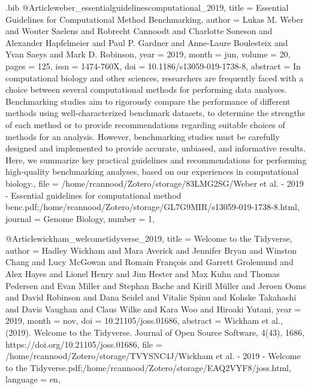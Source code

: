 \documentclass[
  table,
  10pt,
  a4paper]{article}
\begin{document}
\begin{filecontents}{\jobname.bib}
@Article{weber_essentialguidelinescomputational_2019,
	title = {Essential Guidelines for Computational Method Benchmarking},
	author = {Lukas M. Weber and Wouter Saelens and Robrecht Cannoodt and Charlotte Soneson and Alexander Hapfelmeier and Paul P. Gardner and Anne-Laure Boulesteix and Yvan Saeys and Mark D. Robinson},
	year = {2019},
	month = {jun},
	volume = {20},
	pages = {125},
	issn = {1474-760X},
	doi = {10.1186/s13059-019-1738-8},
	abstract = {In computational biology and other sciences, researchers are frequently faced with a choice between several computational methods for performing data analyses. Benchmarking studies aim to rigorously compare the performance of different methods using well-characterized benchmark datasets, to determine the strengths of each method or to provide recommendations regarding suitable choices of methods for an analysis. However, benchmarking studies must be carefully designed and implemented to provide accurate, unbiased, and informative results. Here, we summarize key practical guidelines and recommendations for performing high-quality benchmarking analyses, based on our experiences in computational biology.},
	file = {/home/rcannood/Zotero/storage/83LMG2SG/Weber et al. - 2019 - Essential guidelines for computational method benc.pdf;/home/rcannood/Zotero/storage/GL7G9MIR/s13059-019-1738-8.html},
	journal = {Genome Biology},
	number = {1},
}

@Article{wickham_welcometidyverse_2019,
	title = {Welcome to the {{Tidyverse}}},
	author = {Hadley Wickham and Mara Averick and Jennifer Bryan and Winston Chang and Lucy McGowan and Romain Fran{\c c}ois and Garrett Grolemund and Alex Hayes and Lionel Henry and Jim Hester and Max Kuhn and Thomas Pedersen and Evan Miller and Stephan Bache and Kirill M{\"u}ller and Jeroen Ooms and David Robinson and Dana Seidel and Vitalie Spinu and Kohske Takahashi and Davis Vaughan and Claus Wilke and Kara Woo and Hiroaki Yutani},
	year = {2019},
	month = {nov},
	doi = {10.21105/joss.01686},
	abstract = {Wickham et al., (2019). Welcome to the Tidyverse. Journal of Open Source Software, 4(43), 1686, https://doi.org/10.21105/joss.01686},
	file = {/home/rcannood/Zotero/storage/TVYSNC4J/Wickham et al. - 2019 - Welcome to the Tidyverse.pdf;/home/rcannood/Zotero/storage/EAQ2VYF8/joss.html},
	language = {en},
}


\end{filecontents}
\end{document}

